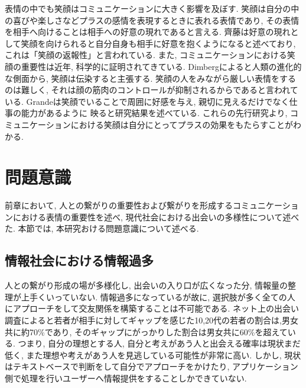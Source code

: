 表情の中でも笑顔はコミュニケーションに大きく影響を及ぼす.
笑顔は自分の中の喜びや楽しさなどプラスの感情を表現するときに表れる表情であり,
その表情を相手へ向けることは相手への好意の現れであると言える.
齊藤は好意の現れとして笑顔を向けられると自分自身も相手に好意を抱くようになると述べており,
これは「笑顔の返報性」と言われている\cite{齊藤勇2005恋愛心理学}.
また, コミュニケーションにおける笑顔の重要性は近年, 科学的に証明されてきている.
Dimbergによると人類の進化的な側面から, 笑顔は伝染すると主張する.
笑顔の人をみながら厳しい表情をするのは難しく,
それは顔の筋肉のコントロールが抑制されるからであると言われている\cite{dimberg2011voluntary}.
Grandeは笑顔でいることで周囲に好感を与え, 親切に見えるだけでなく仕事の能力があるように
映ると研究結果を述べている\cite{grandey2005service}.
これらの先行研究より, コミュニケーションにおける笑顔は自分にとってプラスの効果をもたらすことがわかる.




\section{問題意識}
前章において, 人との繋がりの重要性および繋がりを形成するコミュニケーションにおける表情の重要性を述べ, 現代社会における出会いの多様性について述べた.
本節では, 本研究おける問題意識について述べる.

\subsection{情報社会における情報過多}
人との繋がり形成の場が多様化し, 出会いの入り口が広くなった分, 情報量の整理が上手くいっていない.
情報過多になっているが故に, 選択肢が多く全ての人にアプローチをして交友関係を構築することは不可能である.
ネット上の出会い調査によると若者が相手に対してギャップを感じた10,20代の若者の割合は,男女共に約70\%であり,
そのギャップにがっかりした割合は男女共に60\%を超えている\cite{mandom}.
つまり, 自分の理想とする人, 自分と考えがあう人と出会える確率は現状まだ低く,
また理想や考えがあう人を見逃している可能性が非常に高い.
しかし, 現状はテキストベースで判断をして自分でアプローチをかけたり,
アプリケーション側で処理を行いユーザーへ情報提供をすることしかできていない.

